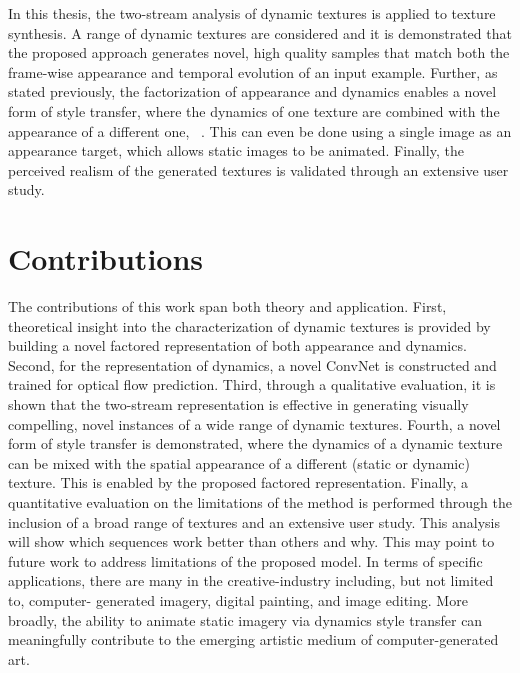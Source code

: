 In this thesis, the two-stream analysis of
dynamic textures is applied to texture synthesis.
A range of dynamic textures are considered and it is demonstrated that the 
proposed approach generates novel, high quality samples that match
both the frame-wise appearance and temporal evolution of an input
example.
Further, as stated previously, the factorization of appearance and dynamics enables a 
novel form of style transfer, where the dynamics of one texture are 
combined with the appearance of a different one,
\cf\ \cite{gatys2016image}.
This can even be done using a single image as an appearance
target, which allows static images to be animated.
Finally, the perceived realism of the generated textures is validated
through an extensive user study.

\section{Contributions}

The contributions of this work span both theory and application. First,
theoretical insight into the characterization of dynamic textures is provided by 
building a novel factored representation of both appearance and dynamics. Second, 
for the representation of dynamics, a novel ConvNet is constructed and trained for 
optical flow prediction. Third, through a qualitative evaluation, it is shown that the two-stream representation is 
effective in generating visually compelling, novel instances of a wide range of 
dynamic textures. Fourth, a novel form of style transfer is demonstrated, 
where the dynamics of a dynamic texture can be mixed with the spatial appearance 
of a different (static or dynamic) texture. This is enabled by the proposed factored 
representation. Finally, a quantitative evaluation on the limitations of the method is performed through 
the inclusion of a broad range of textures and an extensive user study. This analysis will show which 
sequences work better than others and why. This may point to future work to 
address limitations of the proposed model. In terms of specific applications, 
there are many in the creative-industry including, but not limited to, computer-
generated imagery, digital painting, and image editing. More broadly, the ability 
to animate static imagery via dynamics style transfer can meaningfully contribute 
to the emerging artistic medium of computer-generated art.